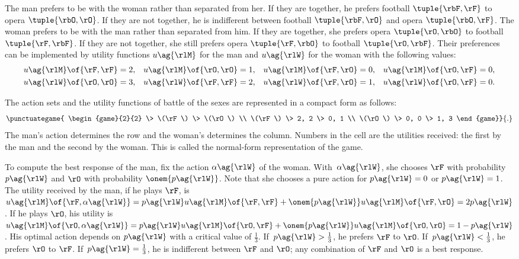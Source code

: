 The man prefers to be with the woman rather than separated from her.
If they are together, he prefers football \(\tuple{\rbF, \rF}\) to opera \(\tuple{\rbO, \rO}\).
If they are not together, he is indifferent between football \(\tuple{\rbF, \rO}\) and opera \(\tuple{\rbO, \rF}\).
The woman prefers to be with the man rather than separated from him.
If they are together, she prefers opera \(\tuple{\rO, \rbO}\) to football \(\tuple{\rF, \rbF}\).
If they are not together, she still prefers opera \(\tuple{\rF, \rbO}\) to football \(\tuple{\rO, \rbF}\).
Their preferences can be implemented by utility functions \(u\ag{\rlM}\) for the man and \(u\ag{\rlW}\) for the woman with the following values:
\begin{equation}
\begin{aligned}
u\ag{\rlM} \of {\rF, \rF}  &= 2, & u\ag{\rlM} \of {\rO, \rO}  &= 1, & u\ag{\rlM} \of {\rF, \rO}  &= 0, & u\ag{\rlM} \of {\rO, \rF}  &= 0, \\
u\ag{\rlW} \of {\rO, \rO}  &= 3, & u\ag{\rlW} \of {\rF, \rF}  &= 2, & u\ag{\rlW} \of {\rF, \rO}  &= 1, & u\ag{\rlW} \of {\rO, \rF}  &= 0.
\end{aligned}
\end{equation}

The action sets and the utility functions of battle of the sexes are represented in a compact form as follows:
\begin{equation}
\label{eq:bos_normal_form}
\punctuategame{
\begin{game}{2}{2}
        \> \(\rF\) \> \(\rO\)  \\
\(\rF\) \> 2, 2    \> 0, 1 \\
\(\rO\) \> 0, 0    \> 1, 3
\end{game}}
{.}\bigskip
\end{equation}
The man's action determines the row and the woman's determines the column.
Numbers in the cell are the utilities received: the first by the man and the second by the woman.
This is called the normal-form representation of the game.

To compute the best response of the man, fix the action \(\alpha\ag{\rlW}\) of the woman.
With~\(\alpha\ag{\rlW}\), she chooses \(\rF\) with probability \(p\ag{\rlW}\) and \(\rO\) with probability \(\onem{p\ag{\rlW}}\).
Note that she chooses a pure action for \(p\ag{\rlW}=0\) or \(p\ag{\rlW}=1\).
The utility received by the man, if he plays \(\rF\), is~\(u\ag{\rlM} \of {\rF, \alpha\ag{\rlW}} = p\ag{\rlW} u\ag{\rlM} \of {\rF, \rF} + \onem{p\ag{\rlW}} u\ag{\rlM} \of {\rF, \rO} = 2p\ag{\rlW}\).
If he plays \(\rO\), his utility is \(u\ag{\rlM} \of {\rO, \alpha\ag{\rlW}} = p\ag{\rlW} u\ag{\rlM} \of {\rO, \rF} + \onem{p\ag{\rlW}} u\ag{\rlM} \of {\rO, \rO} = 1 - p\ag{\rlW}\).
His optimal action depends on \(p\ag{\rlW}\) with a critical value of \(\frac{1}{3}\).
If~\(p\ag{\rlW} > \frac{1}{3}\), he prefers \(\rF\) to \(\rO\).
If~\(p\ag{\rlW} < \frac{1}{3}\), he prefers \(\rO\) to \(\rF\).
If~\(p\ag{\rlW} = \frac{1}{3}\), he is indifferent between \(\rF\) and \(\rO\); any combination of \(\rF\) and \(\rO\) is a best response.


